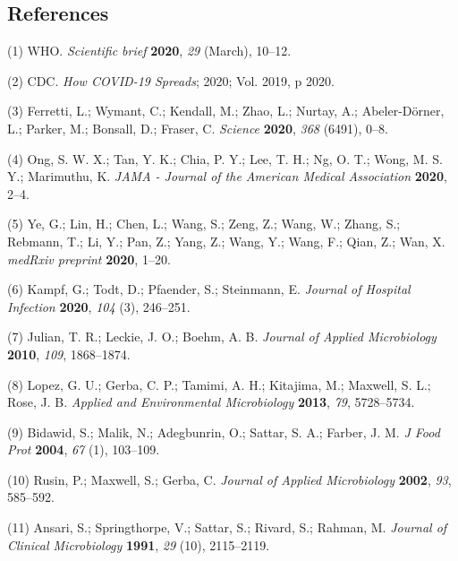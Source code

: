 \documentclass[journal=jacsat,manuscript=article]{achemso}
\begin{document}
\hypertarget{references}{%
\subsection*{References}\label{references}}

\hypertarget{refs}{}
\leavevmode\hypertarget{ref-WHO2020}{}%
(1) WHO. \emph{Scientific brief} \textbf{2020}, \emph{29} (March),
10--12.

\leavevmode\hypertarget{ref-CDC2020}{}%
(2) CDC. \emph{How COVID-19 Spreads}; 2020; Vol. 2019, p 2020.

\leavevmode\hypertarget{ref-Ferretti2020}{}%
(3) Ferretti, L.; Wymant, C.; Kendall, M.; Zhao, L.; Nurtay, A.;
Abeler-Dörner, L.; Parker, M.; Bonsall, D.; Fraser, C. \emph{Science}
\textbf{2020}, \emph{368} (6491), 0--8.

\leavevmode\hypertarget{ref-Ong2020}{}%
(4) Ong, S. W. X.; Tan, Y. K.; Chia, P. Y.; Lee, T. H.; Ng, O. T.; Wong,
M. S. Y.; Marimuthu, K. \emph{JAMA - Journal of the American Medical
Association} \textbf{2020}, 2--4.

\leavevmode\hypertarget{ref-Ye2020}{}%
(5) Ye, G.; Lin, H.; Chen, L.; Wang, S.; Zeng, Z.; Wang, W.; Zhang, S.;
Rebmann, T.; Li, Y.; Pan, Z.; Yang, Z.; Wang, Y.; Wang, F.; Qian, Z.;
Wan, X. \emph{medRxiv preprint} \textbf{2020}, 1--20.

\leavevmode\hypertarget{ref-Kampf2020}{}%
(6) Kampf, G.; Todt, D.; Pfaender, S.; Steinmann, E. \emph{Journal of
Hospital Infection} \textbf{2020}, \emph{104} (3), 246--251.

\leavevmode\hypertarget{ref-Julian2010}{}%
(7) Julian, T. R.; Leckie, J. O.; Boehm, A. B. \emph{Journal of Applied
Microbiology} \textbf{2010}, \emph{109}, 1868--1874.

\leavevmode\hypertarget{ref-Lopez2013}{}%
(8) Lopez, G. U.; Gerba, C. P.; Tamimi, A. H.; Kitajima, M.; Maxwell, S.
L.; Rose, J. B. \emph{Applied and Environmental Microbiology}
\textbf{2013}, \emph{79}, 5728--5734.

\leavevmode\hypertarget{ref-Bidawid2004}{}%
(9) Bidawid, S.; Malik, N.; Adegbunrin, O.; Sattar, S. A.; Farber, J. M.
\emph{J Food Prot} \textbf{2004}, \emph{67} (1), 103--109.

\leavevmode\hypertarget{ref-Rusin2002}{}%
(10) Rusin, P.; Maxwell, S.; Gerba, C. \emph{Journal of Applied
Microbiology} \textbf{2002}, \emph{93}, 585--592.

\leavevmode\hypertarget{ref-Ansari1991}{}%
(11) Ansari, S.; Springthorpe, V.; Sattar, S.; Rivard, S.; Rahman, M.
\emph{Journal of Clinical Microbiology} \textbf{1991}, \emph{29} (10),
2115--2119.
\end{document}

